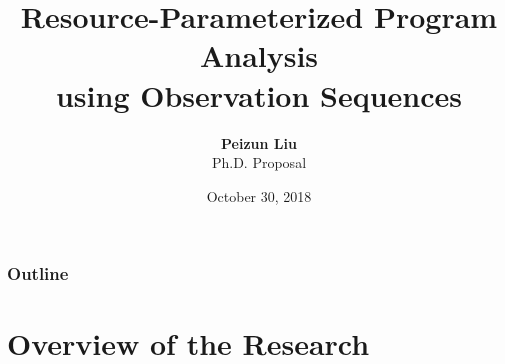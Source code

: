 \documentclass[aspectratio=169]{beamer}
\date{October 30, 2018}
\begin{document}
\title[Resource-Parameterized Program Analysis using OS]{Resource-Parameterized Program Analysis\\ using Observation Sequences} 
\author[2018]{\textbf{Peizun Liu} \\ \vskip8pt
  {\small Ph.D. Proposal}
}


\begin{frame}
  \titlepage
\end{frame}
\begin{frame}
    \frametitle{Outline}
    \tableofcontents[]
\end{frame}

\section{Overview of the Research}
\end{document}
